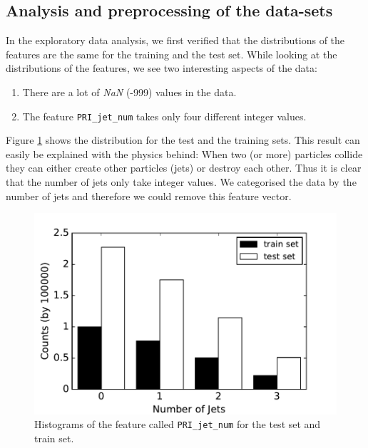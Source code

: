 \documentclass[10pt,conference,compsocconf]{IEEEtran}
\begin{document}
\subsection{Analysis and preprocessing of the data-sets}

In the exploratory data analysis, we first verified that the distributions of the features are the same for the training and the test set. While looking at the distributions of the features, we see two interesting aspects of the data:
\begin{enumerate}
    \item There are a lot of \emph{NaN} (-999) values in the data.
    \item The feature \verb|PRI_jet_num| takes only four different integer values.
\end{enumerate}

Figure \ref{fig:hist_jet} shows the distribution for the test and the training sets. This result can easily be explained with the physics behind: When two (or more) particles collide they can either create other particles (jets) or destroy each other. Thus it is clear that the number of jets only take integer values. We categorised the data by the number of jets and therefore we could remove this feature vector.

\vspace{-0.5cm}
\begin{figure}[h!]
    \centering
    \includegraphics[width=0.9\columnwidth]{hist_jets.pdf}
    \cprotect\caption{Histograms of the feature called \verb|PRI_jet_num| for the test set and train set.}
    \label{fig:hist_jet}
\end{figure} 
\end{document}
